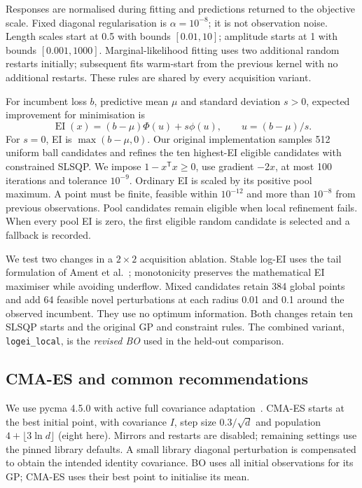 \documentclass[12pt]{article}
\begin{document}
Responses are normalised during fitting and predictions returned to the
objective scale. Fixed diagonal regularisation is $\alpha=10^{-8}$; it is
not observation noise. Length scales start at 0.5 with bounds $[0.01, 10]$;
amplitude starts at 1 with bounds $[0.001, 1000]$. Marginal-likelihood fitting
uses two additional random restarts initially; subsequent fits warm-start
from the previous kernel with no additional restarts. These rules are shared
by every acquisition variant.

For incumbent loss $b$, predictive mean $\mu$ and standard deviation $s>0$,
expected improvement for minimisation is
\[
 \operatorname{EI}(x)=(b-\mu)\Phi(u)+s\phi(u),\qquad u=(b-\mu)/s.
\]
For $s=0$, EI is $\max(b-\mu,0)$. Our original implementation samples 512
uniform ball candidates and refines the ten highest-EI eligible candidates
with constrained SLSQP. We impose $1-x^{\mathsf T}x\geq0$, use gradient
$-2x$, at most 100 iterations and tolerance $10^{-9}$. Ordinary EI is scaled
by its positive pool maximum. A point must be finite, feasible within
$10^{-12}$ and more than $10^{-8}$ from previous observations. Pool candidates
remain eligible when local refinement fails. When every pool EI is zero,
the first eligible random candidate is selected and a fallback is recorded.

We test two changes in a $2\times2$ acquisition ablation. Stable log-EI uses
the tail formulation of Ament et al.~\citep{logei}; monotonicity preserves
the mathematical EI maximiser while avoiding underflow. Mixed candidates
retain 384 global points and add 64 feasible novel perturbations at each
radius 0.01 and 0.1 around the observed incumbent. They use no optimum
information. Both changes retain ten SLSQP starts and the original GP and
constraint rules. The combined variant, \texttt{logei\_local}, is the
\emph{revised BO} used in the held-out comparison.

\subsection{CMA-ES and common recommendations}
We use pycma 4.5.0 with active full covariance adaptation~\citep{pycma,hansen}.
CMA-ES starts at the best initial point, with covariance $I$, step size
$0.3/\sqrt d$ and population $4+\lfloor3\ln d\rfloor$ (eight here).
Mirrors and restarts are disabled; remaining settings use the pinned library
defaults. A small library diagonal perturbation is compensated to obtain the
intended identity covariance. BO uses all initial observations for its GP;
CMA-ES uses their best point to initialise its mean.
\end{document}
